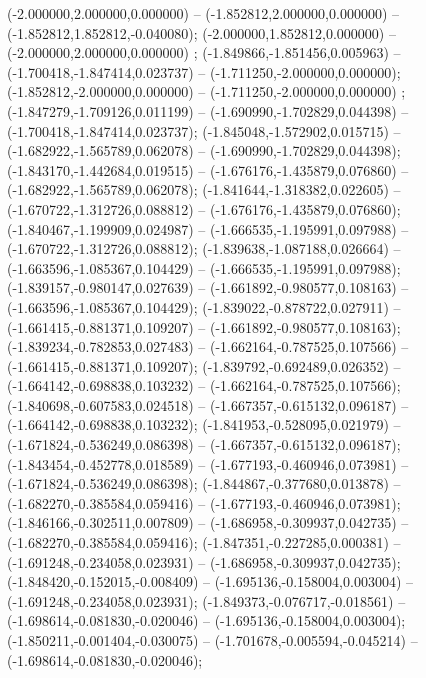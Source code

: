  (-2.000000,2.000000,0.000000) -- (-1.852812,2.000000,0.000000) -- (-1.852812,1.852812,-0.040080);
 (-2.000000,1.852812,0.000000) -- (-2.000000,2.000000,0.000000) ;
 (-1.849866,-1.851456,0.005963) -- (-1.700418,-1.847414,0.023737) -- (-1.711250,-2.000000,0.000000);
 (-1.852812,-2.000000,0.000000) -- (-1.711250,-2.000000,0.000000) ;
 (-1.847279,-1.709126,0.011199) -- (-1.690990,-1.702829,0.044398) -- (-1.700418,-1.847414,0.023737);
 (-1.845048,-1.572902,0.015715) -- (-1.682922,-1.565789,0.062078) -- (-1.690990,-1.702829,0.044398);
 (-1.843170,-1.442684,0.019515) -- (-1.676176,-1.435879,0.076860) -- (-1.682922,-1.565789,0.062078);
 (-1.841644,-1.318382,0.022605) -- (-1.670722,-1.312726,0.088812) -- (-1.676176,-1.435879,0.076860);
 (-1.840467,-1.199909,0.024987) -- (-1.666535,-1.195991,0.097988) -- (-1.670722,-1.312726,0.088812);
 (-1.839638,-1.087188,0.026664) -- (-1.663596,-1.085367,0.104429) -- (-1.666535,-1.195991,0.097988);
 (-1.839157,-0.980147,0.027639) -- (-1.661892,-0.980577,0.108163) -- (-1.663596,-1.085367,0.104429);
 (-1.839022,-0.878722,0.027911) -- (-1.661415,-0.881371,0.109207) -- (-1.661892,-0.980577,0.108163);
 (-1.839234,-0.782853,0.027483) -- (-1.662164,-0.787525,0.107566) -- (-1.661415,-0.881371,0.109207);
 (-1.839792,-0.692489,0.026352) -- (-1.664142,-0.698838,0.103232) -- (-1.662164,-0.787525,0.107566);
 (-1.840698,-0.607583,0.024518) -- (-1.667357,-0.615132,0.096187) -- (-1.664142,-0.698838,0.103232);
 (-1.841953,-0.528095,0.021979) -- (-1.671824,-0.536249,0.086398) -- (-1.667357,-0.615132,0.096187);
 (-1.843454,-0.452778,0.018589) -- (-1.677193,-0.460946,0.073981) -- (-1.671824,-0.536249,0.086398);
 (-1.844867,-0.377680,0.013878) -- (-1.682270,-0.385584,0.059416) -- (-1.677193,-0.460946,0.073981);
 (-1.846166,-0.302511,0.007809) -- (-1.686958,-0.309937,0.042735) -- (-1.682270,-0.385584,0.059416);
 (-1.847351,-0.227285,0.000381) -- (-1.691248,-0.234058,0.023931) -- (-1.686958,-0.309937,0.042735);
 (-1.848420,-0.152015,-0.008409) -- (-1.695136,-0.158004,0.003004) -- (-1.691248,-0.234058,0.023931);
 (-1.849373,-0.076717,-0.018561) -- (-1.698614,-0.081830,-0.020046) -- (-1.695136,-0.158004,0.003004);
 (-1.850211,-0.001404,-0.030075) -- (-1.701678,-0.005594,-0.045214) -- (-1.698614,-0.081830,-0.020046);
